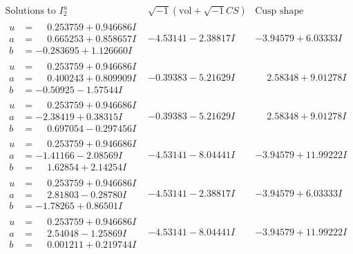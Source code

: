\documentclass[1p]{elsarticle_modified}
\theoremstyle{definition}
\newcommand{\I}{\sqrt{-1}}
\begin{document}
$$\begin{array}{c|c|c}  
\text{Solutions to }I^u_{2}& \I (\text{vol} + \sqrt{-1}CS) & \text{Cusp shape}\\
 \hline 
\begin{aligned}
u &= \phantom{-}0.253759 + 0.946686 I \\
a &= \phantom{-}0.665253 + 0.858657 I \\
b &= -0.283695 + 1.126660 I\end{aligned}
 & -4.53141 - 2.38817 I & -3.94579 + 6.03333 I \\ \hline\begin{aligned}
u &= \phantom{-}0.253759 + 0.946686 I \\
a &= \phantom{-}0.400243 + 0.809909 I \\
b &= -0.50925 - 1.57544 I\end{aligned}
 & -0.39383 - 5.21629 I & \phantom{-}2.58348 + 9.01278 I \\ \hline\begin{aligned}
u &= \phantom{-}0.253759 + 0.946686 I \\
a &= -2.38419 + 0.38315 I \\
b &= \phantom{-}0.697054 - 0.297456 I\end{aligned}
 & -0.39383 - 5.21629 I & \phantom{-}2.58348 + 9.01278 I \\ \hline\begin{aligned}
u &= \phantom{-}0.253759 + 0.946686 I \\
a &= -1.41166 - 2.08569 I \\
b &= \phantom{-}1.62854 + 2.14254 I\end{aligned}
 & -4.53141 - 8.04441 I & -3.94579 + 11.99222 I \\ \hline\begin{aligned}
u &= \phantom{-}0.253759 + 0.946686 I \\
a &= \phantom{-}2.81803 - 0.28780 I \\
b &= -1.78265 + 0.86501 I\end{aligned}
 & -4.53141 - 2.38817 I & -3.94579 + 6.03333 I \\ \hline\begin{aligned}
u &= \phantom{-}0.253759 + 0.946686 I \\
a &= \phantom{-}2.54048 - 1.25869 I \\
b &= \phantom{-}0.001211 + 0.219744 I\end{aligned}
 & -4.53141 - 8.04441 I & -3.94579 + 11.99222 I \\ \hline\begin{aligned}

\end{aligned}
\end{array}$$
\end{document}
